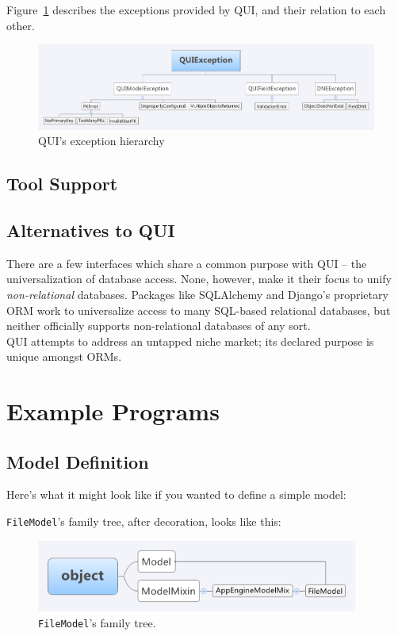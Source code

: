 \documentclass{article} %
\newcommand{\il}[1]{\lstinline{#1}}
\begin{document}
Figure~\ref{fig:exceptionhier} describes the exceptions provided by QUI, and their relation to each other.
\begin{figure}
\centering
\includegraphics[width=450px]{ExceptionHierarchy}
\caption{QUI's exception hierarchy}
\label{fig:exceptionhier}
\end{figure}


\subsection{Tool Support}


\subsection{Alternatives to QUI}
There are a few interfaces which share a common purpose with QUI -- the universalization of database access. None, however,
make it their focus to unify \emph{non-relational} databases. Packages like SQLAlchemy and Django's proprietary ORM work to
universalize access to many SQL-based relational databases, but neither officially supports non-relational databases of any sort.\\

QUI attempts to address an untapped niche market; its declared purpose is unique amongst ORMs.

\section{Example Programs}
\subsection{Model Definition}
Here's what it might look like if you wanted to define a simple model:

\il{FileModel}'s family tree, after decoration, looks like this:
\begin{figure}[htb]
\centering
\includegraphics[width=400px]{FileModelInheritanceTree}
\caption{\il{FileModel}'s family tree.}
\end{figure}
\end{document}
